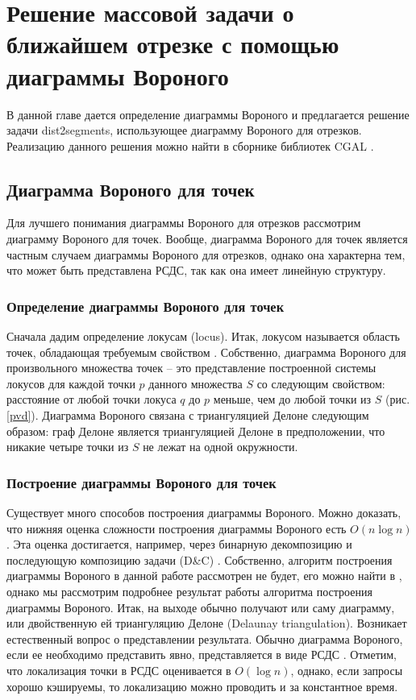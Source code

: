 \chapter{Решение массовой задачи о ближайшем отрезке с помощью диаграммы Вороного}
\label{chapSVD}

В данной главе дается определение диаграммы Вороного и предлагается
решение задачи dist2segments, использующее диаграмму Вороного для
отрезков. Реализацию данного решения можно найти в сборнике библиотек
CGAL \cite{CGAL}.

\section{Диаграмма Вороного для точек}

Для лучшего понимания диаграммы Вороного для отрезков рассмотрим
диаграмму Вороного для точек. Вообще, диаграмма Вороного для точек
является частным случаем диаграммы
Вороного для отрезков, однако она
характерна тем, что может быть представлена РСДС, так как она имеет
линейную структуру.

\subsection{Определение диаграммы Вороного для точек}

Сначала дадим определение локусам (locus). Итак, локусом называется
область точек, обладающая требуемым свойством \cite{PrSh}. Собственно, диаграмма
Вороного для произвольного множества точек -- это представление
построенной системы локусов для каждой точки $p$ данного множества $S$ со
следующим свойством: расстояние от любой точки локуса $q$ до $p$ меньше, чем
до любой точки из $S$ (рис. \ref{pvd}). Диаграмма Вороного связана с триангуляцией Делоне \cite{PrSh, CGAL} следующим
образом: граф Делоне является триангуляцией Делоне в предположении, что
никакие четыре точки из $S$ не лежат на одной окружности.


\subsection{Построение диаграммы Вороного для точек}

Существует много способов построения диаграммы Вороного. Можно
доказать, что нижняя оценка сложности построения диаграммы Вороного есть
$O(n \log n)$. Эта оценка достигается, например, через бинарную декомпозицию и
последующую композицию задачи (D\&C) \cite{PrSh}. Собственно, алгоритм
построения диаграммы Вороного в данной работе рассмотрен не будет, его
можно найти в \cite{PrSh, CGAL}, однако мы рассмотрим подробнее результат работы
алгоритма построения диаграммы Вороного. Итак, на выходе обычно получают
или саму диаграмму, или двойственную ей триангуляцию Делоне (Delaunay
triangulation). Возникает естественный вопрос о представлении результата.
Обычно диаграмма Вороного, если ее необходимо представить явно,
представляется в виде РСДС \cite{PrSh}. Отметим, что локализация точки в РСДС
оценивается в $O(\log n)$, однако, если запросы хорошо кэшируемы, то
локализацию можно проводить и за константное время.

